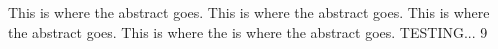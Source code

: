 This is where the abstract goes.  This is where the abstract
goes. This is where the abstract goes.  This is where the 
is where the abstract goes.
TESTING...
\cite{ontology}{9}

